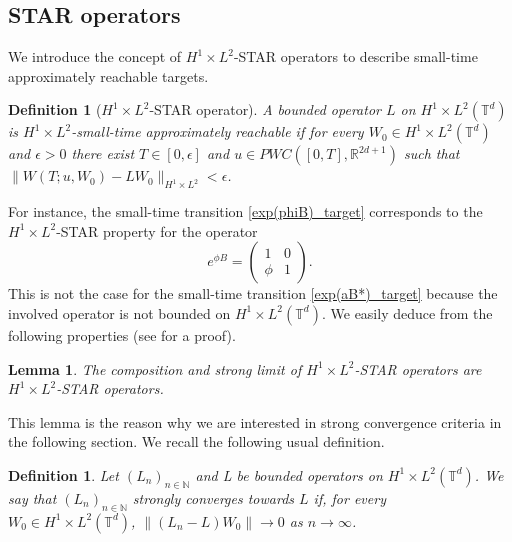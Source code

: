 \documentclass[a4paper]{article}
\theoremstyle{plain}
\newtheorem{lemma}[theorem]{Lemma}
\newtheorem{definition}[theorem]{Definition}
\newcommand{\T}{\mathbb{T}}
\newcommand{\R}{\mathbb{R}}
\newcommand{\N}{\mathbb{N}}
\begin{document}
\subsection{STAR operators}


We introduce the concept of $H^1\times L^2$-STAR operators to describe small-time approximately reachable targets.


\begin{definition}[$H^1\times L^2$-STAR operator] \label{def:STARop}
A bounded operator $L$ on $H^1 \times L^2(\T^d)$ is $H^1 \times L^2$-small-time approximately reachable if for every $W_0 \in H^1 \times L^2(\T^d)$ and $\epsilon>0$ there exist $T \in [0,\epsilon]$ and $u \in PWC([0,T],\R^{2d+1})$ such that $\| W(T;u,W_0) - LW_0 \|_{H^1 \times L^2}<\epsilon$.
\end{definition}

For instance, the small-time transition \eqref{exp(phiB)_target} corresponds to the $H^1 \times L^2$-STAR property for the operator 
\begin{equation} \label{exp(phiB)}
e^{\phi B}=\begin{pmatrix}
    1 & 0 \\ \phi & 1 
\end{pmatrix}. 
\end{equation}
This is not the case for the small-time transition \eqref{exp(aB*)_target} because the involved operator is not bounded on $H^1 \times L^2(\T^d)$. We easily deduce from  the following properties (see  for a proof).

\begin{lemma} \label{Lem:STAR}
The composition and strong limit of $H^1 \times L^2$-STAR operators are $H^1 \times L^2$-STAR operators.
\end{lemma}

This lemma is the reason why we are interested in strong convergence criteria in the following section. We recall the following usual definition.

\begin{definition}
Let $(L_n)_{n\in\N}$ and L be bounded operators on $H^1 \times L^2(\T^d)$.
We say that $(L_n)_{n\in\N}$ strongly converges towards $L$ if, for every $W_0 \in H^1 \times L^2(\T^d)$, $\|(L_n-L) W_0 \| \to 0$ as $n \to \infty$.
\end{definition}



\end{document}
